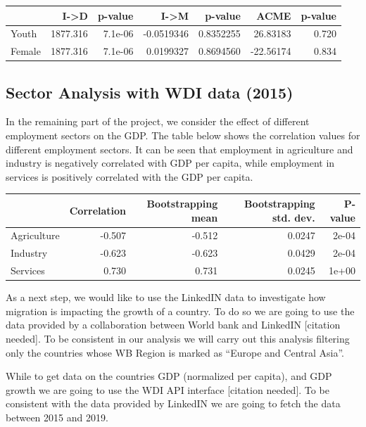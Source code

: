\documentclass[
]{article}
\begin{document}
\begin{table}
\centering
\begin{tabular}{l|r|r|r|r|r|r}
\hline
  & I->D & p-value & I->M & p-value & ACME & p-value\\
\hline
Youth & 1877.316 & 7.1e-06 & -0.0519346 & 0.8352255 & 26.83183 & 0.720\\
\hline
Female & 1877.316 & 7.1e-06 & 0.0199327 & 0.8694560 & -22.56174 & 0.834\\
\hline
\end{tabular}
\end{table}

\hypertarget{sector-analysis-with-wdi-data-2015}{%
\subsection{Sector Analysis with WDI data
(2015)}\label{sector-analysis-with-wdi-data-2015}}

In the remaining part of the project, we consider the effect of
different employment sectors on the GDP. The table below shows the
correlation values for different employment sectors. It can be seen that
employment in agriculture and industry is negatively correlated with GDP
per capita, while employment in services is positively correlated with
the GDP per capita.

\begin{table}
\centering
\begin{tabular}{l|r|r|r|r}
\hline
  & Correlation & Bootstrapping mean & Bootstrapping std. dev. & P-value\\
\hline
Agriculture & -0.507 & -0.512 & 0.0247 & 2e-04\\
\hline
Industry & -0.623 & -0.623 & 0.0429 & 2e-04\\
\hline
Services & 0.730 & 0.731 & 0.0245 & 1e+00\\
\hline
\end{tabular}
\end{table}

As a next step, we would like to use the LinkedIN data to investigate
how migration is impacting the growth of a country. To do so we are
going to use the data provided by a collaboration between World bank and
LinkedIN {[}citation needed{]}. To be consistent in our analysis we will
carry out this analysis filtering only the countries whose WB Region is
marked as ``Europe and Central Asia''.

While to get data on the countries GDP (normalized per capita), and GDP
growth we are going to use the WDI API interface {[}citation needed{]}.
To be consistent with the data provided by LinkedIN we are going to
fetch the data between 2015 and 2019.
\end{document}
